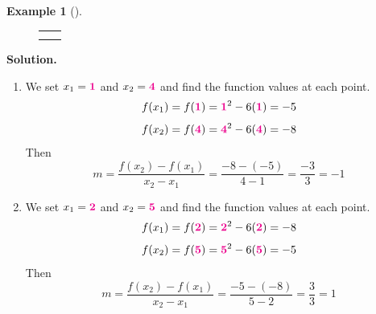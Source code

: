 \documentclass[10pt,]{book}
\theoremstyle{plain}
\theoremstyle{definition}
\theoremstyle{definition}
\newtheorem{example}[theorem]{Example}
\theoremstyle{definition}
\theoremstyle{definition}
\numberwithin{equation}{part}
\newlength{\panelmax}
\newcommand{\alert}[1]{\boldsymbol{\color{magenta}{#1}}}
\begin{document}
\begin{example}[]
{\leavevmode%
\setlength{\tabcolsep}{0\textwidth}
\begin{figure}
\begin{tabular}{@{}*{2}{c}@{}}
\begin{minipage}[c][\panelmax][t]{0.5\textwidth}\usebox{\panelboxBAVp}\end{minipage}&
\begin{minipage}[c][\panelmax][t]{0.5\textwidth}\usebox{\panelboxDZimage}\end{minipage}\tabularnewline
&
\parbox[t]{0.5\textwidth}{
}\end{tabular}
\end{figure}
}%
\par\medskip\noindent%
\textbf{Solution.}\quad \leavevmode%
\begin{enumerate}[label=*\alph**]
\item\hypertarget{li-901}{}We set \(x_1 = \alert{1}\) and \(x_2 = \alert{4}\) and find the function values at each point.%
\begin{equation*}
f (x_1) = f (\alert{1}) = \alert{1}^2 - 6(\alert{1}) = -5
\end{equation*}
%
\begin{equation*}
f (x_2) = f (\alert{4}) = \alert{4}^2 - 6(\alert{4}) = -8
\end{equation*}
Then%
\begin{equation*}
m = \frac{f (x_2) - f (x_1)}{x_2 - x_1}
=\frac{-8 - (-5)}{4 - 1}=\frac{-3}{3}= -1
\end{equation*}
%
\item\hypertarget{li-902}{}We set \(x_1 = \alert{2}\) and \(x_2 = \alert{5}\) and find the function values at each point.%
\begin{equation*}
f (x_1) = f (\alert{2}) = \alert{2}^2 - 6(\alert{2}) = -8
\end{equation*}
%
\begin{equation*}
f (x_2) = f (\alert{5}) = \alert{5}^2 - 6(\alert{5}) = -5
\end{equation*}
Then%
\begin{equation*}
m = \frac{f (x_2) - f (x_1)}{x_2 - x_1}
=\frac{-5 - (-8)}{5 - 2}=\frac{3}{3}= 1
\end{equation*}
%
\end{enumerate}
%
\end{example}
\end{document}
